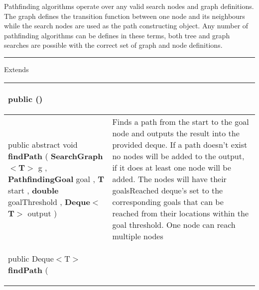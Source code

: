  {\scriptsize Pathfinding algorithms operate over any valid search nodes and graph definitions. The graph defines the transition function between one node and its neighbours while the search nodes are used as \newline%
 the path constructing object. Any number of pathfinding algorithms can be defines in these terms, both tree and graph searches are possible with the correct set of graph and node definitions.
 
\vspace*{4pt} \hrule \vspace*{3pt}
Extends \textbf{ \hyperref[tab:SearchNode]{\color{blue}{SearchNode}} }
\vspace*{-5pt} 
\begin{tabularx}{\linewidth}{m{}|m{}}
\label{tab:PathfindingAlgorithm}
\begin{raggedleft}public  \textbf{\hyperref[tab:PathfindingAlgorithm]{\color{blue}{PathfindingAlgorithm}}}()
\end{raggedleft} &
 \\ \hline 
\begin{raggedleft}public abstract void \textbf{findPath }(\newline \hfill 
\hspace*{ 5pt} \textbf{SearchGraph$<$T$>$} g , \newline
 \hspace*{ 5pt} \textbf{PathfindingGoal} goal , \newline
 \hspace*{ 5pt} \textbf{T} start , \newline
 \hspace*{ 5pt} \textbf{double} goalThreshold , \newline
 \hspace*{ 5pt} \textbf{Deque$<$T$>$} output  )
\end{raggedleft} &
 Finds a path from the start to the goal node and outputs the result into the provided deque.\newline%
 If a path doesn't exist no nodes will be added to the output, if it does at least one node will be added. The nodes will have their goalsReached deque's set\newline%
 to the corresponding goals that can be reached from their locations within the goal threshold. One node can reach multiple nodes\\ \hline 
\begin{raggedleft}public Deque$<$T$>$ \textbf{findPath }(\newline \hfill 

\end{raggedleft}
\end{tabularx}}
